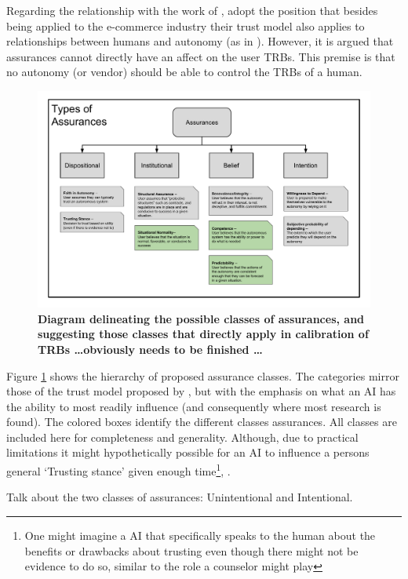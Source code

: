     Regarding the relationship with the work of \citet{McKnight2001-fa}, adopt the position that besides being applied to the e-commerce industry their trust model also applies to relationships between humans and autonomy (as in \citet{Lillard2016-yg}). However, it is argued that assurances cannot directly have an affect on the user TRBs. This premise is that no autonomy (or vendor) should be able to control the TRBs of a human.

	\begin{figure}
        \includegraphics[width=8in]{Figures/Assurances.pdf}%
    	\caption{\textbf{Diagram delineating the possible classes of assurances, and suggesting those classes that directly apply in calibration of TRBs \ldots obviously needs to be finished \ldots}}
        \label{fig:Assurance_classes}
    \end{figure}

    Figure \ref{fig:Assurance_classes} shows the hierarchy of proposed assurance classes. The categories mirror those of the trust model proposed by \citet{McKnight2001-fa}, but with the emphasis on what an AI has the ability to most readily influence (and consequently where most research is found). The colored boxes identify the different classes assurances. All classes are included here for completeness and generality. Although, due to practical limitations it might hypothetically possible for an AI to influence a persons general `Trusting stance' given enough time\footnote{One might imagine a AI that specifically speaks to the human about the benefits or drawbacks about trusting even though there might not be evidence to do so, similar to the role a counselor might play}, .

    Talk about the two classes of assurances: Unintentional and Intentional.

